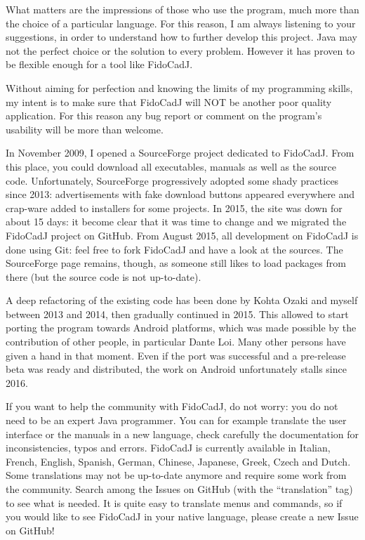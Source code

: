 \documentclass[10pt,a4paper,twoside]{scrreprt}
\begin{document}
What matters are the impressions of those who use the program, much
more than the choice of a particular language. For this reason, I
am always listening to your suggestions, in order to understand how
to further develop this project. Java
may not the perfect choice or the solution to every problem. However
it has proven to be flexible enough for a tool like FidoCadJ.


Without aiming for perfection and knowing the limits of my programming skills,
my intent is to make sure that FidoCadJ will NOT be another poor quality
application. For this reason any bug report or comment on the program's
usability will be more than welcome.

In November 2009, I opened a SourceForge project dedicated to FidoCadJ. From this place, you could download all executables, manuals as well as the source code. Unfortunately, SourceForge progressively adopted some shady practices since 2013: advertisements with fake download buttons appeared everywhere and crap-ware added to installers for some projects. In 2015, the site was down for about 15 days: it become clear that it was time to change and we migrated the FidoCadJ project on GitHub. From August 2015, all development on FidoCadJ is done using Git: feel free to fork FidoCadJ and have a look at the sources. The SourceForge page remains, though, as someone still likes to load packages from there (but the source code is not up-to-date).

A deep refactoring of the existing code has been done by Kohta Ozaki and myself between 2013 and 2014, then gradually continued in 2015. This allowed to start porting the program towards Android platforms, which was made possible by the contribution of other people, in particular Dante Loi. Many other persons have given a hand in that moment. Even if the port was successful and a pre-release beta was ready and distributed, the work on Android unfortunately stalls since 2016.

If you want to help the community with FidoCadJ, do not worry: you do not need to be an expert Java programmer. You can for example translate the user interface or the manuals in a new language, check carefully the documentation for inconsistencies, typos and errors. FidoCadJ is currently available in Italian, French, English, Spanish, German, Chinese, Japanese, Greek, Czech and Dutch. Some translations may not be up-to-date anymore and require some work from the community. Search among the Issues on GitHub (with the ``translation'' tag) to see what is needed.
It is quite easy to translate menus and commands, so if you would
like to see FidoCadJ in your native language, please create a new Issue on GitHub!
\end{document}
